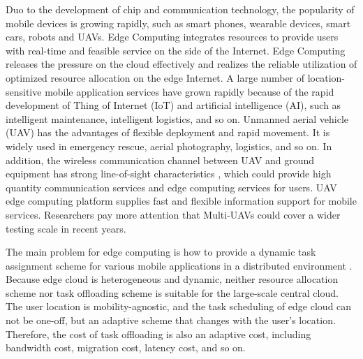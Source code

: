 \documentclass[journal,article,submit,pdftex,moreauthors]{Definitions/mdpi}
\begin{document}
Duo to the development of chip and communication technology, the popularity of mobile devices is growing rapidly, such as smart phones, wearable devices, smart cars, robots and UAVs. Edge Computing integrates resources to provide users with real-time and feasible service on the side of the Internet. Edge Computing releases the pressure on the cloud effectively and realizes the reliable utilization of optimized resource allocation on the edge Internet. A large number of location-sensitive mobile application services have grown rapidly because of the rapid development of Thing of Internet (IoT) and artificial intelligence (AI), such as intelligent maintenance, intelligent logistics, and so on. Unmanned aerial vehicle (UAV) has the advantages of flexible deployment and rapid movement. It is widely used in emergency rescue, aerial photography, logistics, and so on. In addition, the wireless communication channel between UAV and ground equipment has strong line-of-sight characteristics \cite{WU Q}, which could provide high quantity communication services and edge computing services for users. UAV edge computing platform supplies fast and flexible information support for mobile services. Researchers pay more attention that Multi-UAVs could cover a wider testing scale in recent years\cite{CUI G F,JI J,WANG Y P}.

The main problem for edge computing is how to provide a dynamic task assignment scheme for various mobile applications in a distributed environment \cite{GOPIKA P,PAN J L,ZHANG K Y,ZHANG N,WANG S,LIU}. Because edge cloud is heterogeneous and dynamic, neither resource allocation scheme nor task offloading scheme is suitable for the large-scale central cloud. The user location is mobility-agnostic, and the task scheduling of edge cloud can not be one-off, but an adaptive scheme that changes with the user's location. Therefore, the cost of task offloading is also an adaptive cost, including bandwidth cost, migration cost, latency cost, and so on\cite{WANG}.
\end{document}
